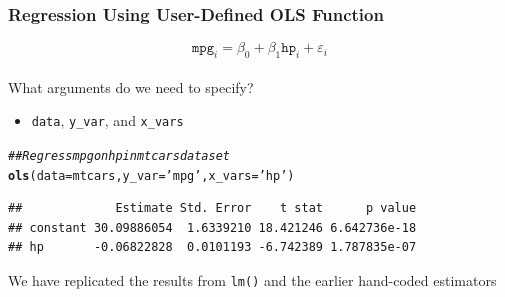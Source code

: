 \documentclass{beamer}\usepackage[]{graphicx}\usepackage[]{color}
\makeatletter
\newcommand{\hlstr}[1]{\textcolor[rgb]{0.192,0.494,0.8}{#1}}%
\newcommand{\hlcom}[1]{\textcolor[rgb]{0.678,0.584,0.686}{\textit{#1}}}%
\newcommand{\hlstd}[1]{\textcolor[rgb]{0.345,0.345,0.345}{#1}}%
\newcommand{\hlkwc}[1]{\textcolor[rgb]{0.333,0.667,0.333}{#1}}%
\newcommand{\hlkwd}[1]{\textcolor[rgb]{0.737,0.353,0.396}{\textbf{#1}}}%
\newenvironment{kframe}{%
 \def\at@end@of@kframe{}%
 \ifinner\ifhmode%
  \def\at@end@of@kframe{\end{minipage}}%
  \begin{minipage}{\columnwidth}%
 \fi\fi%
 \def\FrameCommand##1{\hskip\@totalleftmargin \hskip-\fboxsep
 \colorbox{shadecolor}{##1}\hskip-\fboxsep
     \hskip-\linewidth \hskip-\@totalleftmargin \hskip\columnwidth}%
 \MakeFramed {\advance\hsize-\width
   \@totalleftmargin\z@ \linewidth\hsize
   \@setminipage}}%
 {\par\unskip\endMakeFramed%
 \at@end@of@kframe}
\newenvironment{knitrout}{}{} %
\makeatother
\begin{document}
\begin{frame}[fragile]\frametitle{Regression Using User-Defined OLS Function}
    \vspace{-1ex}
    $$\texttt{mpg}_i = \beta_0 + \beta_1 \texttt{hp}_i + \varepsilon_i$$ \\
    \vspace{2ex}
    What arguments do we need to specify?
    \begin{itemize}
        \item \texttt{data}, \texttt{y\_var}, and \texttt{x\_vars}
    \end{itemize}
\begin{knitrout}\footnotesize
{}\color{fgcolor}\begin{kframe}
\begin{alltt}
\hlcom{## Regress mpg on hp in mtcars dataset}
\hlkwd{ols}\hlstd{(}\hlkwc{data} \hlstd{= mtcars,} \hlkwc{y_var} \hlstd{=} \hlstr{'mpg'}\hlstd{,} \hlkwc{x_vars} \hlstd{=} \hlstr{'hp'}\hlstd{)}
\end{alltt}
\begin{verbatim}
##             Estimate Std. Error    t stat      p value
## constant 30.09886054  1.6339210 18.421246 6.642736e-18
## hp       -0.06822828  0.0101193 -6.742389 1.787835e-07
\end{verbatim}
\end{kframe}
\end{knitrout}
    \vspace{2ex}
    We have replicated the results from \texttt{lm()} and the earlier hand-coded estimators \\
\end{frame}
\end{document}
